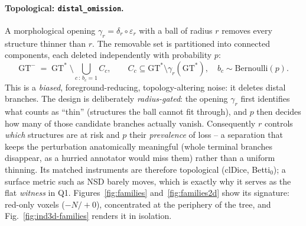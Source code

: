 \documentclass[
    bookmarks, bookmarksnumbered, bookmarksopen,
    colorlinks=true, citecolor=blue, linkcolor=blue, urlcolor=blue
]{techrep}
\newcommand{\gtstar}{\ensuremath{\mathrm{GT}^{\!*}}}
\newcommand{\gtminus}{\ensuremath{\mathrm{GT}^{\!-}}}
\begin{document}
\paragraph{Topological: \texttt{distal\_omission}.} A morphological opening
$\gamma_r=\delta_r\!\circ\!\varepsilon_r$ with a ball of radius $r$ removes every
structure thinner than $r$. The removable set is partitioned into connected
components, each deleted independently with probability $p$:
\begin{equation}
  \gtminus \;=\; \gtstar \;\setminus\!\!\bigcup_{c\,:\,b_c=1}\!\! C_c,
  \qquad C_c\subseteq \gtstar\setminus\gamma_r(\gtstar),
  \quad b_c\sim\text{Bernoulli}(p).
\end{equation}
This is a \emph{biased}, foreground-reducing, topology-altering noise: it deletes
distal branches. The design is deliberately \emph{radius-gated}: the opening $\gamma_r$
first identifies what counts as ``thin'' (structures the ball cannot fit through), and $p$
then decides how many of those candidate branches actually vanish. Consequently $r$ controls
\emph{which} structures are at risk and $p$ their \emph{prevalence} of loss -- a separation
that keeps the perturbation anatomically meaningful (whole terminal branches disappear, as a
hurried annotator would miss them) rather than a uniform thinning. Its matched instruments are
therefore topological (clDice, Betti$_0$); a surface metric such as NSD barely moves, which is
exactly why it serves as the flat \emph{witness} in Q1. Figures~\ref{fig:families}
and~\ref{fig:families2d} show its signature: red-only voxels ($-N/+0$), concentrated at the
periphery of the tree, and Fig.~\ref{fig:ind3d-families} renders it in isolation.
\end{document}
